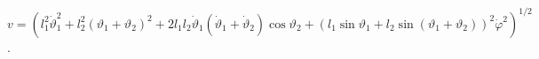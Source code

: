 $v = \left(l^2_1 \dot{\vartheta}^2_1 +
l^2_2(\vartheta _1 + \vartheta _2)^2 +
2l_1l_2\dot{\vartheta}_1(\dot{\vartheta}_1 +
\dot{\vartheta}_2)\cos{\vartheta_2} +
(l_1\sin{\vartheta _1} + l_2\sin{(\vartheta _1 + \vartheta _2)})^2
\dot{\varphi}^2\right) ^{1/2}$.
